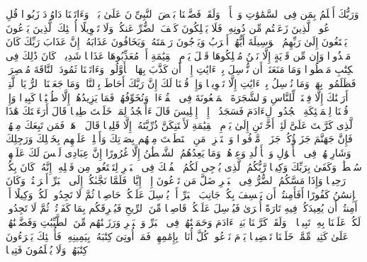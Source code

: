 وَرَبُّكَ أَعۡلَمُ بِمَن فِی ٱلسَّمَٰوَٰتِ وَٱلۡأَرۡضِۗ وَلَقَدۡ فَضَّلۡنَا بَعۡضَ ٱلنَّبِیِّۦنَ عَلَىٰ بَعۡضࣲۖ وَءَاتَیۡنَا دَاوُۥدَ زَبُورࣰا%
\stopbuffer%
\startbuffer[\q:17:56]
قُلِ ٱدۡعُوا۟ ٱلَّذِینَ زَعَمۡتُم مِّن دُونِهِۦ فَلَا یَمۡلِكُونَ كَشۡفَ ٱلضُّرِّ عَنكُمۡ وَلَا تَحۡوِیلًا%
\stopbuffer%
\startbuffer[\q:17:57]
أُو۟لَٰۤئِكَ ٱلَّذِینَ یَدۡعُونَ یَبۡتَغُونَ إِلَىٰ رَبِّهِمُ ٱلۡوَسِیلَةَ أَیُّهُمۡ أَقۡرَبُ وَیَرۡجُونَ رَحۡمَتَهُۥ وَیَخَافُونَ عَذَابَهُۥۤۚ إِنَّ عَذَابَ رَبِّكَ كَانَ مَحۡذُورࣰا%
\stopbuffer%
\startbuffer[\q:17:58]
وَإِن مِّن قَرۡیَةٍ إِلَّا نَحۡنُ مُهۡلِكُوهَا قَبۡلَ یَوۡمِ ٱلۡقِیَٰمَةِ أَوۡ مُعَذِّبُوهَا عَذَابࣰا شَدِیدࣰاۚ كَانَ ذَٰلِكَ فِی ٱلۡكِتَٰبِ مَسۡطُورࣰا%
\stopbuffer%
\startbuffer[\q:17:59]
وَمَا مَنَعَنَاۤ أَن نُّرۡسِلَ بِٱلۡءَایَٰتِ إِلَّاۤ أَن كَذَّبَ بِهَا ٱلۡأَوَّلُونَۚ وَءَاتَیۡنَا ثَمُودَ ٱلنَّاقَةَ مُبۡصِرَةࣰ فَظَلَمُوا۟ بِهَاۚ وَمَا نُرۡسِلُ بِٱلۡءَایَٰتِ إِلَّا تَخۡوِیفࣰا%
\stopbuffer%
\startbuffer[\q:17:60]
وَإِذۡ قُلۡنَا لَكَ إِنَّ رَبَّكَ أَحَاطَ بِٱلنَّاسِۚ وَمَا جَعَلۡنَا ٱلرُّءۡیَا ٱلَّتِیۤ أَرَیۡنَٰكَ إِلَّا فِتۡنَةࣰ لِّلنَّاسِ وَٱلشَّجَرَةَ ٱلۡمَلۡعُونَةَ فِی ٱلۡقُرۡءَانِۚ وَنُخَوِّفُهُمۡ فَمَا یَزِیدُهُمۡ إِلَّا طُغۡیَٰنࣰا كَبِیرࣰا%
\stopbuffer%
\startbuffer[\q:17:61]
وَإِذۡ قُلۡنَا لِلۡمَلَٰۤئِكَةِ ٱسۡجُدُوا۟ لِءَادَمَ فَسَجَدُوۤا۟ إِلَّاۤ إِبۡلِیسَ قَالَ ءَأَسۡجُدُ لِمَنۡ خَلَقۡتَ طِینࣰا%
\stopbuffer%
\startbuffer[\q:17:62]
قَالَ أَرَءَیۡتَكَ هَٰذَا ٱلَّذِی كَرَّمۡتَ عَلَیَّ لَئِنۡ أَخَّرۡتَنِ إِلَىٰ یَوۡمِ ٱلۡقِیَٰمَةِ لَأَحۡتَنِكَنَّ ذُرِّیَّتَهُۥۤ إِلَّا قَلِیلࣰا%
\stopbuffer%
\startbuffer[\q:17:63]
قَالَ ٱذۡهَبۡ فَمَن تَبِعَكَ مِنۡهُمۡ فَإِنَّ جَهَنَّمَ جَزَاۤؤُكُمۡ جَزَاۤءࣰ مَّوۡفُورࣰا%
\stopbuffer%
\startbuffer[\q:17:64]
وَٱسۡتَفۡزِزۡ مَنِ ٱسۡتَطَعۡتَ مِنۡهُم بِصَوۡتِكَ وَأَجۡلِبۡ عَلَیۡهِم بِخَیۡلِكَ وَرَجِلِكَ وَشَارِكۡهُمۡ فِی ٱلۡأَمۡوَٰلِ وَٱلۡأَوۡلَٰدِ وَعِدۡهُمۡۚ وَمَا یَعِدُهُمُ ٱلشَّیۡطَٰنُ إِلَّا غُرُورًا%
\stopbuffer%
\startbuffer[\q:17:65]
إِنَّ عِبَادِی لَیۡسَ لَكَ عَلَیۡهِمۡ سُلۡطَٰنࣱۚ وَكَفَىٰ بِرَبِّكَ وَكِیلࣰا%
\stopbuffer%
\startbuffer[\q:17:66]
رَّبُّكُمُ ٱلَّذِی یُزۡجِی لَكُمُ ٱلۡفُلۡكَ فِی ٱلۡبَحۡرِ لِتَبۡتَغُوا۟ مِن فَضۡلِهِۦۤۚ إِنَّهُۥ كَانَ بِكُمۡ رَحِیمࣰا%
\stopbuffer%
\startbuffer[\q:17:67]
وَإِذَا مَسَّكُمُ ٱلضُّرُّ فِی ٱلۡبَحۡرِ ضَلَّ مَن تَدۡعُونَ إِلَّاۤ إِیَّاهُۖ فَلَمَّا نَجَّىٰكُمۡ إِلَى ٱلۡبَرِّ أَعۡرَضۡتُمۡۚ وَكَانَ ٱلۡإِنسَٰنُ كَفُورًا%
\stopbuffer%
\startbuffer[\q:17:68]
أَفَأَمِنتُمۡ أَن یَخۡسِفَ بِكُمۡ جَانِبَ ٱلۡبَرِّ أَوۡ یُرۡسِلَ عَلَیۡكُمۡ حَاصِبࣰا ثُمَّ لَا تَجِدُوا۟ لَكُمۡ وَكِیلًا%
\stopbuffer%
\startbuffer[\q:17:69]
أَمۡ أَمِنتُمۡ أَن یُعِیدَكُمۡ فِیهِ تَارَةً أُخۡرَىٰ فَیُرۡسِلَ عَلَیۡكُمۡ قَاصِفࣰا مِّنَ ٱلرِّیحِ فَیُغۡرِقَكُم بِمَا كَفَرۡتُمۡ ثُمَّ لَا تَجِدُوا۟ لَكُمۡ عَلَیۡنَا بِهِۦ تَبِیعࣰا%
\stopbuffer%
\startbuffer[\q:17:70]
۞ وَلَقَدۡ كَرَّمۡنَا بَنِیۤ ءَادَمَ وَحَمَلۡنَٰهُمۡ فِی ٱلۡبَرِّ وَٱلۡبَحۡرِ وَرَزَقۡنَٰهُم مِّنَ ٱلطَّیِّبَٰتِ وَفَضَّلۡنَٰهُمۡ عَلَىٰ كَثِیرࣲ مِّمَّنۡ خَلَقۡنَا تَفۡضِیلࣰا%
\stopbuffer%
\startbuffer[\q:17:71]
یَوۡمَ نَدۡعُوا۟ كُلَّ أُنَاسِۭ بِإِمَٰمِهِمۡۖ فَمَنۡ أُوتِیَ كِتَٰبَهُۥ بِیَمِینِهِۦ فَأُو۟لَٰۤئِكَ یَقۡرَءُونَ كِتَٰبَهُمۡ وَلَا یُظۡلَمُونَ فَتِیلࣰا%
\stopbuffer%
